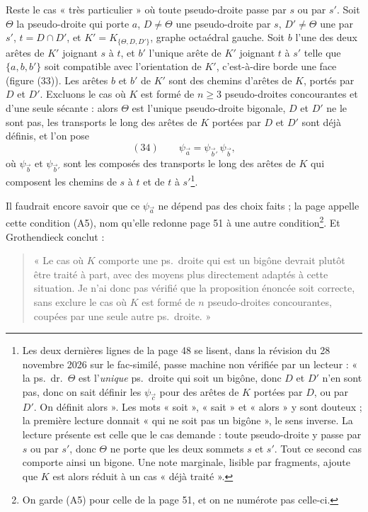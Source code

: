 \documentclass[11pt,a4paper]{article}
\begin{document}
Reste le cas « très particulier » où toute pseudo-droite passe par $s$ ou par
$s'$. Soit $\Theta$ la pseudo-droite qui porte $a$, $D \neq \Theta$ une
pseudo-droite par $s$, $D' \neq \Theta$ une par $s'$, $t = D \cap D'$, et
$K' = K_{\{\Theta, D, D'\}}$, graphe octaédral gauche. Soit $b$ l'une des deux
arêtes de $K'$ joignant $s$ à $t$, et $b'$ l'unique arête de $K'$ joignant
$t$ à $s'$ telle que $\{a, b, b'\}$ soit compatible avec l'orientation de
$K'$, c'est-à-dire borde une face (figure (33)). Les arêtes $b$ et $b'$ de
$K'$ sont des chemins d'arêtes de $K$, portés par $D$ et $D'$. Excluons le
cas où $K$ est formé de $n \geqslant 3$ pseudo-droites concourantes et d'une
seule sécante : alors $\Theta$ est l'unique pseudo-droite bigonale, $D$ et
$D'$ ne le sont pas, les transports le long des arêtes de $K$ portées par $D$
et $D'$ sont déjà définis, et l'on pose
\[
(34) \qquad \psi_{\vec{a}} = \psi_{\vec{b}'} \, \psi_{\vec{b}},
\]
où $\psi_{\vec{b}}$ et $\psi_{\vec{b}'}$ sont les composés des transports le
long des arêtes de $K$ qui composent les chemins de $s$ à $t$ et de $t$ à
$s'$\footnote{Les deux dernières lignes de la page 48 se lisent, dans la
révision du 28 novembre 2026 sur le fac-similé, passe machine non vérifiée par un lecteur :
« la ps.\ dr.\ $\Theta$ est l'\emph{unique} ps.\ droite qui soit un bigône,
donc $D$ et $D'$ n'en sont pas, donc on sait définir les $\psi_{\vec{c}}$ pour
des arêtes de $K$ portées par $D$, ou par $D'$. On définit alors ». Les mots
« soit », « sait » et « alors » y sont douteux ; la première lecture donnait
« qui ne soit pas un bigône », le sens inverse. La lecture présente est celle
que le cas demande : toute pseudo-droite y passe par $s$ ou par $s'$, donc
$\Theta$ ne porte que les deux sommets $s$ et $s'$. Tout ce second cas comporte
ainsi un bigone. Une note marginale, lisible par fragments, ajoute que $K$
est alors réduit à un cas « déjà traité ».}.

Il faudrait encore savoir que ce $\psi_{\vec{a}}$ ne dépend pas des choix
faits ; la page appelle cette condition (A5), nom qu'elle redonne page 51 à
une autre condition\footnote{On garde (A5) pour celle de la page 51, et on
ne numérote pas celle-ci.}. Et Grothendieck conclut :

\begin{quote}
« Le cas où $K$ comporte une ps.\ droite qui est un bigône devrait plutôt
être traité à part, avec des moyens plus directement adaptés à cette
situation. Je n'ai donc pas vérifié que la proposition énoncée soit correcte,
sans exclure le cas où $K$ est formé de $n$ pseudo-droites concourantes,
coupées par une seule autre ps.\ droite. »
\end{quote}
\end{document}
